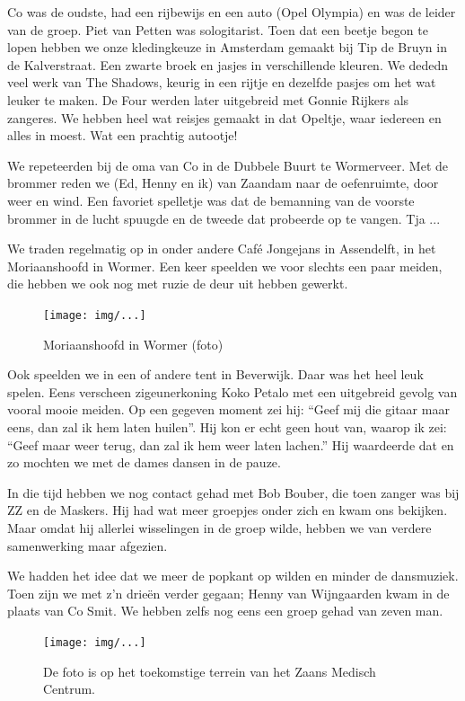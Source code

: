 \documentclass[12pt,twoside]{memoir}
\begin{document}
Co was de oudste, had een rijbewijs en een auto (Opel Olympia) en was de leider van de groep. Piet van Petten was sologitarist. Toen dat een beetje begon te lopen hebben we onze kledingkeuze in Amsterdam gemaakt bij Tip de Bruyn in de Kalverstraat. Een zwarte broek en jasjes in verschillende kleuren. We dededn veel werk van The Shadows, keurig in een rijtje en dezelfde pasjes om het wat leuker te maken. De Four werden later uitgebreid met Gonnie Rijkers als zangeres. We hebben heel wat reisjes gemaakt in dat Opeltje, waar iedereen en alles in moest. Wat een prachtig autootje!

We repeteerden bij de oma van Co in de Dubbele Buurt te Wormerveer. Met de brommer reden we (Ed, Henny en ik) van Zaandam naar de oefenruimte, door weer en wind. Een favoriet spelletje was dat de bemanning van de voorste brommer in de lucht spuugde en de tweede dat probeerde op te vangen. Tja ...

We traden regelmatig op in onder andere Café Jongejans in Assendelft, in het Moriaanshoofd in Wormer. Een keer speelden we voor slechts een paar meiden, die hebben we ook nog met ruzie de deur uit hebben gewerkt. 

\begin{figure}[t]
\texttt{[image: img/...]}
\caption{Moriaanshoofd in Wormer (foto)}
\end{figure}

Ook speelden we in een of andere tent in Beverwijk. Daar was het heel leuk spelen. Eens verscheen zigeunerkoning Koko Petalo met een uitgebreid gevolg van vooral mooie meiden. Op een gegeven moment zei hij: ``Geef mij die gitaar maar eens, dan zal ik hem laten huilen''. Hij kon er echt geen hout van, waarop ik zei: ``Geef maar weer terug, dan zal ik hem weer laten lachen.'' Hij waardeerde dat en zo mochten we met de dames dansen in de pauze.

In die tijd hebben we nog contact gehad met Bob Bouber, die toen zanger was bij ZZ en de Maskers. Hij had wat meer groepjes onder zich en kwam ons bekijken. Maar omdat hij allerlei wisselingen in de groep wilde, hebben we van verdere samenwerking maar afgezien. 

We hadden het idee dat we meer de popkant op wilden en minder de dansmuziek. Toen zijn we met z’n drieën verder gegaan; Henny van Wijngaarden kwam in de plaats van Co Smit. We hebben zelfs nog eens een groep gehad van zeven man.

\begin{figure}[t]
\texttt{[image: img/...]}
\caption{De foto is op het toekomstige terrein van het Zaans Medisch Centrum.}
\end{figure}
\end{document}
